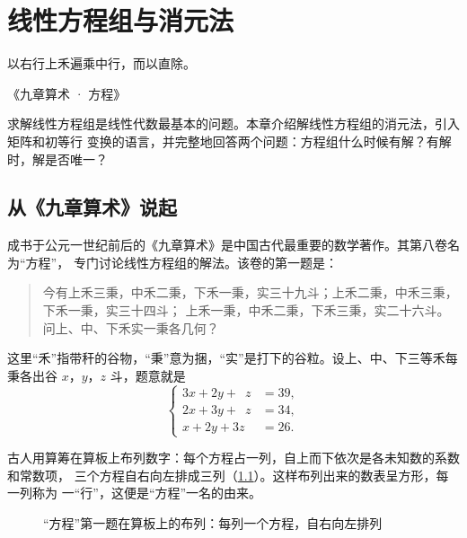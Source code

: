 \chapter{线性方程组与消元法}\label{chap:systems}

\epigraph{以右行上禾遍乘中行，而以直除。}{《九章算术 · 方程》}
\chaptertoc

求解线性方程组是线性代数最基本的问题。本章介绍解线性方程组的消元法，引入矩阵和初等行
变换的语言，并完整地回答两个问题：方程组什么时候有解？有解时，解是否唯一？

\section{从《九章算术》说起}\label{sec:jiuzhang}

成书于公元一世纪前后的《九章算术》是中国古代最重要的数学著作。其第八卷名为“方程”，
专门讨论线性方程组的解法。该卷的第一题是：

\begin{quote}
\kaishu
今有上禾三秉，中禾二秉，下禾一秉，实三十九斗；上禾二秉，中禾三秉，下禾一秉，实三十四斗；
上禾一秉，中禾二秉，下禾三秉，实二十六斗。问上、中、下禾实一秉各几何？
\end{quote}

这里“禾”指带秆的谷物，“秉”意为捆，“实”是打下的谷粒。设上、中、下三等禾每秉各出谷
$x$，$y$，$z$ 斗，题意就是
\begin{equation}\label{eq:he}
\left\{
\begin{aligned}
  3x+2y+\phantom{3}z&=39,\\
  2x+3y+\phantom{3}z&=34,\\
  x+2y+3z&=26.
\end{aligned}
\right.
\end{equation}

古人用算筹在算板上布列数字：每个方程占一列，自上而下依次是各未知数的系数和常数项，
三个方程自右向左排成三列（\cref{fig:suanchou}）。这样布列出来的数表呈方形，每一列称为
一“行”，这便是“方程”一名的由来。

\begin{figure}[htbp]
\centering
{}
\caption{“方程”第一题在算板上的布列：每列一个方程，自右向左排列}
\label{fig:suanchou}
\end{figure}

